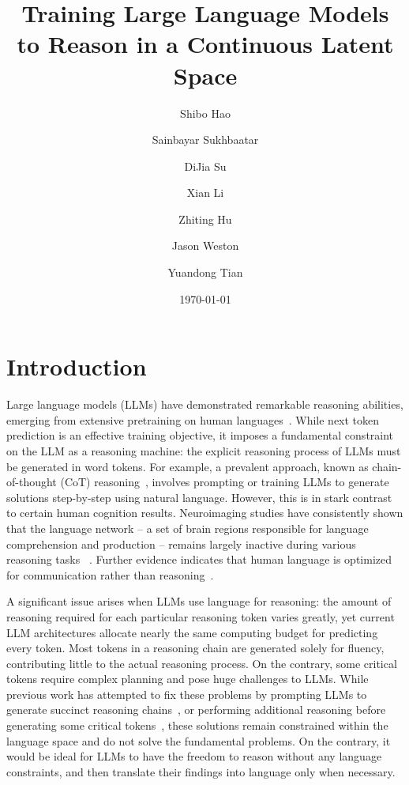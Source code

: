 \documentclass[]{fairmeta}
\title{Training Large Language Models to Reason in a Continuous Latent Space}
\author[1,2,*]{Shibo Hao}
\author[1]{Sainbayar Sukhbaatar}
\author[1]{DiJia Su}
\author[1]{Xian Li}
\author[2]{Zhiting Hu}
\author[1]{Jason Weston}
\author[1]{Yuandong Tian}
\affiliation[1]{FAIR at Meta}
\affiliation[2]{UC San Diego}
\date{\today}
\begin{document}
\maketitle

\section{Introduction}
\label{section:intro}
Large language models (LLMs) have demonstrated remarkable reasoning abilities, emerging from extensive pretraining on human languages~\citep{dubey2024llama, achiam2023gpt}. While next token prediction is an effective training objective, it imposes a fundamental constraint on the LLM as a reasoning machine: the explicit reasoning process of LLMs must be generated in word tokens. For example, a prevalent approach, known as chain-of-thought (CoT) reasoning~\citep{wei2022chain}, involves prompting or training LLMs to generate solutions step-by-step using natural language. However, this is in stark contrast to certain human cognition results. Neuroimaging studies have consistently shown that the language network -- a set of brain regions responsible for language comprehension and production -- remains largely inactive during various reasoning tasks ~\citep{amalric2019distinct, monti2012thought, monti2007functional, monti2009boundaries, fedorenko2011functional}. Further evidence indicates that human language is optimized for communication rather than reasoning~\citep{fedorenko2024language}.

A significant issue arises when LLMs use language for reasoning: the amount of reasoning required for each particular reasoning token varies greatly, yet current LLM architectures allocate nearly the same computing budget for predicting every token. Most tokens in a reasoning chain are generated solely for fluency, contributing little to the actual reasoning process. On the contrary, some critical tokens require complex planning and pose huge challenges to LLMs. While previous work has attempted to fix these problems by prompting LLMs to generate succinct reasoning chains~\citep{madaan2022text}, or performing additional reasoning before generating some critical tokens~\citep{zelikman2024quiet}, these solutions remain constrained within the language space and do not solve the fundamental problems. On the contrary, it would be ideal for LLMs to have the freedom to reason without any language constraints, and then translate their findings into language only when necessary.


\end{document}
